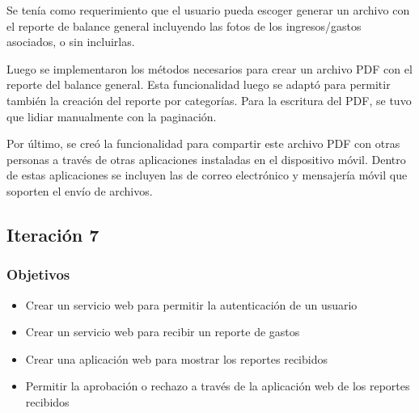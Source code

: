 Se tenía como requerimiento que el usuario pueda escoger generar un archivo con el reporte de balance general incluyendo las fotos de los ingresos/gastos asociados, o sin incluirlas.

Luego se implementaron los métodos necesarios para crear un archivo PDF con el reporte del balance general. Esta funcionalidad luego se adaptó para permitir también la creación del reporte por categorías. Para la escritura del PDF, se tuvo que lidiar manualmente con la paginación. 

Por último, se creó la funcionalidad para compartir este archivo PDF con otras personas a través de otras aplicaciones instaladas en el dispositivo móvil. Dentro de estas aplicaciones se incluyen las de correo electrónico y mensajería móvil que soporten el envío de archivos.



\subsection{Iteración 7}
\subsubsection{Objetivos}
\begin{itemize}
\item Crear un servicio web para permitir la autenticación de un usuario
\item Crear un servicio web para recibir un reporte de gastos
\item Crear una aplicación web para mostrar los reportes recibidos
\item Permitir la aprobación o rechazo a través de la aplicación web de los reportes recibidos
\end{itemize}
